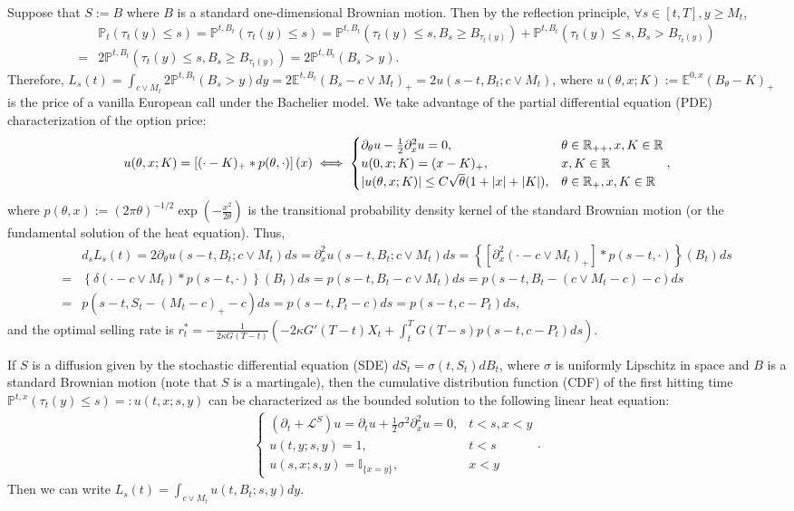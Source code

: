 \documentclass[openany,oneside]{article}
\theoremstyle{definition}
\theoremstyle{remark}
\newcommand{\E}{\mathbb{E}} %
\renewcommand{\P}{\mathbb{P}} %
\newcommand{\I}{\mathbb{I}} %
\DeclarePairedDelimiter{\abs}{\lvert}{\rvert} %
\begin{document}
Suppose that $S:=B$ where $B$ is a standard one-dimensional Brownian motion. Then by the reflection principle, $\forall s\in[t,T], y\ge M_t$,
\begin{align*}
& \P_t(\tau_t(y)\le s) = \P^{t,B_t}(\tau_t(y)\le s) = \P^{t,B_t}(\tau_t(y)\le s, B_s\ge B_{\tau_t(y)}) + \P^{t,B_t}(\tau_t(y)\le s, B_s > B_{\tau_t(y)}) \\
=& 2\P^{t,B_t}(\tau_t(y)\le s, B_s\ge B_{\tau_t(y)}) = 2\P^{t,B_t}(B_s>y).
\end{align*}
Therefore, $L_s(t)=\int_{c\vee M_t}2\P^{t,B_t}(B_s > y) dy=2\E^{t,B_t}(B_s-c\vee M_t)_+ = 2u(s-t,B_t; c\vee M_t)$, where $u(\theta,x;K):=\E^{0,x}(B_\theta-K)_+$ is the price of a vanilla European call under the Bachelier model. We take advantage of the partial differential equation (PDE) characterization of the option price:
\begin{align*}
u(\theta,x;K) = \left[(\cdot-K)_+ \ast p(\theta,\cdot)\right](x) \iff
\begin{cases}
\partial_\theta u - \frac{1}{2}\partial^2_x u =0, & \theta\in\mathbb{R}_{++}, x,K\in\mathbb{R} \\
u(0,x;K)=(x-K)_+, & x,K\in\mathbb{R} \\
\abs{u(\theta,x;K)} \le C\sqrt{\theta}(1+\abs{x}+\abs{K}), & \theta\in\mathbb{R}_+, x,K\in\mathbb{R}
\end{cases},
\end{align*}
where $p(\theta,x):=(2\pi\theta)^{-1/2}\exp\left(-\frac{x^2}{2\theta}\right)$ is the transitional probability density kernel of the standard Brownian motion (or the fundamental solution of the heat equation). Thus,
\begin{align*}
& d_s L_s(t) = 2\partial_\theta u(s-t,B_t;c\vee M_t) ds = \partial^2_x u(s-t,B_t;c\vee M_t) ds = \left\{\left[\partial^2_x (\cdot-c\vee M_t)_+\right]\ast p(s-t,\cdot)\right\}(B_t) ds \\
=& \left\{\delta(\cdot-c\vee M_t) \ast p(s-t,\cdot)\right\}(B_t) ds = p(s-t,B_t-c\vee M_t)ds = p(s-t,B_t-(c\vee M_t-c)-c) ds \\
=& p(s-t, S_t-(M_t-c)_+ -c) ds = p(s-t,P_t-c)ds = p(s-t,c-P_t)ds,
\end{align*}
and the optimal selling rate is $r^\ast_t = -\frac{1}{2\kappa G(T-t)}\left(-2\kappa G'(T-t) X_t + \int_t^T G(T-s)p(s-t,c-P_t)ds\right)$.

If $S$ is a diffusion given by the stochastic differential equation (SDE) $dS_t = \sigma(t,S_t) dB_t$, where $\sigma$ is uniformly Lipschitz in space and $B$ is a standard Brownian motion (note that $S$ is a martingale), then the cumulative distribution function (CDF) of the first hitting time $\P^{t,x}(\tau_t(y)\le s)=:u(t,x;s,y)$ can be characterized as the bounded solution to the following linear heat equation:
\begin{align*}
\begin{cases}
(\partial_t + \mathcal{L}^S)u = \partial_t u + \frac{1}{2}\sigma^2\partial^2_x u = 0, & t<s, x<y \\
u(t,y;s,y)=1, & t<s \\
u(s,x;s,y)=\I_{\{x=y\}}, & x<y
\end{cases}.
\end{align*}
Then we can write $L_s(t) = \int_{c\vee M_t} u(t,B_t;s,y) dy$.
\end{document}
